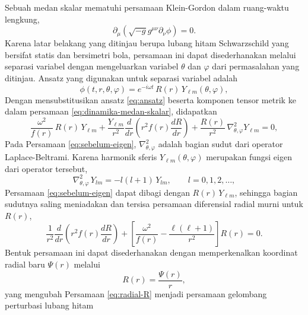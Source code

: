 \noindent Sebuah medan skalar mematuhi persamaan Klein-Gordon dalam ruang-waktu lengkung,
\begin{equation}
    \partial_\mu \left(\sqrt{-g} g^{\mu\nu} \partial_\nu \phi\right) = 0.
    \label{eq:dinamika-medan-skalar}
\end{equation}
Karena latar belakang yang ditinjau berupa lubang hitam Schwarzschild yang bersifat statis 
dan bersimetri bola, persamaan ini dapat disederhanakan melalui separasi variabel dengan 
mengeluarkan variabel $\theta$ dan $\varphi$ dari permasalahan yang ditinjau. Ansatz yang 
digunakan untuk separasi variabel adalah
\begin{equation}
    \phi(t, r, \theta, \varphi) = e^{-i\omega t}\, R(r)\, Y_{\ell m}(\theta, \varphi),
    \label{eq:ansatz}
\end{equation}
Dengan mensubstitusikan ansatz \eqref{eq:ansatz} beserta komponen tensor metrik ke dalam 
persamaan \eqref{eq:dinamika-medan-skalar}, didapatkan
\begin{equation}
    \frac{\omega^2}{f(r)}\, R(r)\, Y_{\ell m} + \frac{Y_{\ell m}}{r^2}\frac{d}{dr}\left(r^2 f(r) \frac{dR}{dr}\right) + \frac{R(r)}{r^2}\, \nabla^2_{\theta,\varphi} Y_{\ell m} = 0,
    \label{eq:sebelum-eigen}
\end{equation}
Pada Persamaan \eqref{eq:sebelum-eigen}, 
$\nabla^2_{\theta,\varphi}$ adalah bagian sudut dari operator Laplace-Beltrami. Karena 
harmonik sferis $Y_{\ell m}(\theta,\varphi)$ merupakan fungsi eigen dari operator tersebut,
\begin{equation}
    \nabla^2_{\theta,\varphi}\, Y_{lm} = -l(l+1)\, Y_{lm}, \qquad l = 0, 1, 2, \dots,
    \label{eq:eigen-harmonik-sferis}
\end{equation}
Persamaan \eqref{eq:sebelum-eigen} dapat dibagi dengan $R(r)\,Y_{\ell m}$, sehingga bagian sudutnya
saling meniadakan dan tersisa persamaan diferensial radial murni untuk $R(r)$,
\begin{equation}
    \frac{1}{r^2}\frac{d}{dr}\left(r^2 f(r) \frac{dR}{dr}\right) + \left[\frac{\omega^2}{f(r)} - \frac{\ell(\ell+1)}{r^2}\right] R(r) = 0.
    \label{eq:radial-R}
\end{equation}
Bentuk persamaan ini dapat disederhanakan dengan memperkenalkan koordinat radial baru $\Psi(r)$ 
melalui
\begin{equation}
    R(r) = \frac{\Psi(r)}{r},
    \label{eq:transformasi-psi}
\end{equation}
yang mengubah Persamaan \eqref{eq:radial-R} menjadi persamaan gelombang perturbasi lubang hitam 
